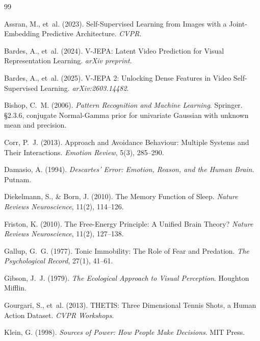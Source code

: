 \documentclass[11pt]{article}
\begin{document}
\begin{thebibliography}{99}

Assran, M., et~al. (2023).
\newblock Self-Supervised Learning from Images with a Joint-Embedding Predictive Architecture.
\newblock \emph{CVPR}.

Bardes, A., et~al. (2024).
\newblock V-JEPA: Latent Video Prediction for Visual Representation Learning.
\newblock \emph{arXiv preprint}.

Bardes, A., et~al. (2025).
\newblock V-JEPA 2: Unlocking Dense Features in Video Self-Supervised Learning.
\newblock \emph{arXiv:2603.14482}.

Bishop, C.~M. (2006).
\newblock \emph{Pattern Recognition and Machine Learning}.
\newblock Springer. \S2.3.6, conjugate Normal-Gamma prior for univariate Gaussian with unknown mean and precision.

Corr, P.~J. (2013).
\newblock Approach and Avoidance Behaviour: Multiple Systems and Their Interactions.
\newblock \emph{Emotion Review}, 5(3), 285--290.

Damasio, A. (1994).
\newblock \emph{Descartes' Error: Emotion, Reason, and the Human Brain}.
\newblock Putnam.

Diekelmann, S., \& Born, J. (2010).
\newblock The Memory Function of Sleep.
\newblock \emph{Nature Reviews Neuroscience}, 11(2), 114--126.

Friston, K. (2010).
\newblock The Free-Energy Principle: A Unified Brain Theory?
\newblock \emph{Nature Reviews Neuroscience}, 11(2), 127--138.

Gallup, G.~G. (1977).
\newblock Tonic Immobility: The Role of Fear and Predation.
\newblock \emph{The Psychological Record}, 27(1), 41--61.

Gibson, J.~J. (1979).
\newblock \emph{The Ecological Approach to Visual Perception}.
\newblock Houghton Mifflin.

Gourgari, S., et~al. (2013).
\newblock THETIS: Three Dimensional Tennis Shots, a Human Action Dataset.
\newblock \emph{CVPR Workshops}.

Klein, G. (1998).
\newblock \emph{Sources of Power: How People Make Decisions}.
\newblock MIT Press.


\end{thebibliography}
\end{document}
